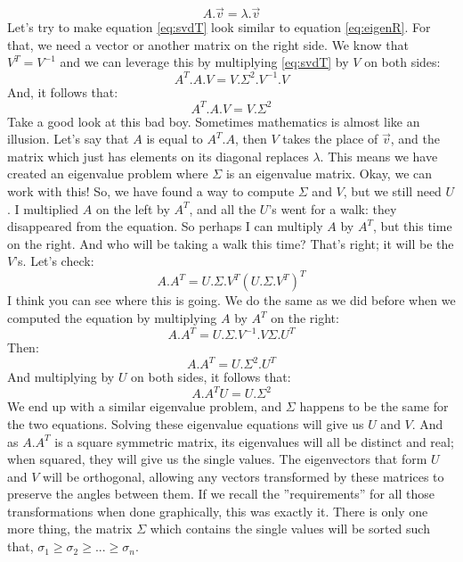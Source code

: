 \documentclass[600paper, 11pt,twoside,openany]{kdp}
\begin{document}
\begin{equation}\label{eq:eigenR}
A.\overrightarrow{v} = \lambda.\overrightarrow{v}
\end{equation}
\indent Let’s try to make equation \ref{eq:svdT} look similar to equation \ref{eq:eigenR}. For that, we need a vector or another matrix on the right side. We know that $V^T=V^{−1}$ and we can leverage this by multiplying \ref{eq:svdT} by $V$ on both sides:
\[A^T.A.V = V.\Sigma^2.V^{-1}.V\]
\indent And, it follows that:
\begin{equation}\label{eq:finalV}
A^T.A.V = V.\Sigma^2
\end{equation}
\indent Take a good look at this bad boy. Sometimes mathematics is almost like an illusion. Let’s say that $A$ is equal to $A^T.A$, then $V$ takes the place of $\overrightarrow{v}$, and the matrix which just has elements on its diagonal replaces $\lambda$. This means we have created an eigenvalue problem where $\Sigma$ is an eigenvalue matrix. Okay, we can work with this! So, we have found a way to compute $\Sigma$ and $V$, but we still need $U$. I multiplied $A$ on the left by $A^T$, and all the $U$’s went for a walk: they disappeared from the equation. So perhaps I can multiply $A$ by $A^T$, but this time on the right. And who will be taking a walk this time? That’s right; it will be the $V$'s. Let’s check:
\[A.A^T = U.\Sigma.V^T(U.\Sigma.V^T)^T \]
\indent I think you can see where this is going. We do the same as we did before when we computed the equation by multiplying $A$ by $A^T$ on the right:
\[A.A^T =  U.\Sigma.V^{-1}.V\Sigma.U^T\]
\indent Then:
\[A.A^T =  U.\Sigma^2.U^T\]
\indent And multiplying by $U$ on both sides, it follows that:
\begin{equation}\label{eq:finalU}
A.A^T U =  U.\Sigma^2 
\end{equation}
\indent We end up with a similar eigenvalue problem, and $\Sigma$ happens to be the same for the two equations. Solving these eigenvalue equations will give us $U$ and $V$. And as $A.A^T$ is a square symmetric matrix, its eigenvalues will all be distinct and real; when squared, they will give us the single values. The eigenvectors that form $U$ and $V$ will be orthogonal, allowing any vectors transformed by these matrices to preserve the angles between them. If we recall the ”requirements” for all those transformations when done graphically, this was exactly it. There is only one more thing, the matrix $\Sigma$ which contains the single values will be sorted such that,  $\sigma_1 \geq \sigma_2 \geq ... \geq \sigma_n$.
\par 
\end{document}
